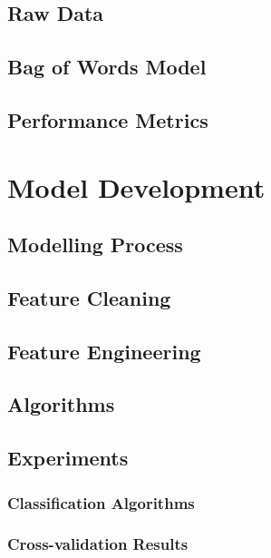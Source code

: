 \documentclass[11pt]{report}
\begin{document}
\section{Raw Data}

\section{Bag of Words Model}
\section{Performance Metrics}


\chapter{Model Development}

\section{Modelling Process}

\section{Feature Cleaning}

\section{Feature Engineering}
\section{Algorithms}

\section{Experiments}
\subsection{Classification Algorithms}
\subsection{Cross-validation Results}
\end{document}
